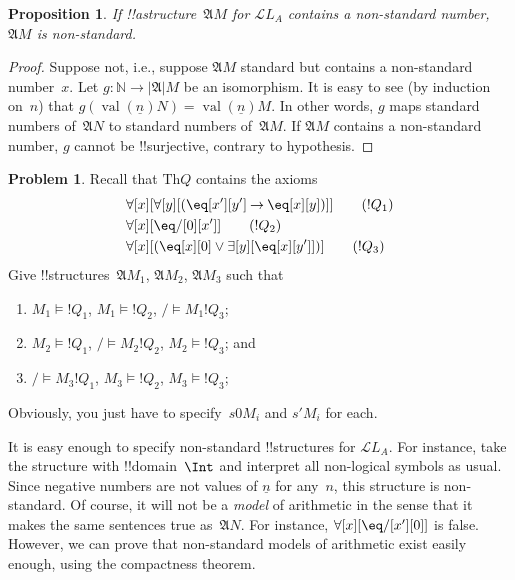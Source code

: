 \documentclass[10pt,a4paper]{article}
\theoremstyle{plain}
\newtheorem{prop}[thm]{Proposition}
\theoremstyle{definition}
\newtheorem{prob}{Problem}[section]
\theoremstyle{remark}
\newenvironment{explain}{}{}
\providecommand{\lif}{\mathbin{\rightarrow}}
\providecommand{\lforall}{\mathord{\forall}}
\providecommand{\lexists}{\mathord{\exists}}
\providecommand{\Obj}{}
\providecommand{\Struct}{\ensuremath{\mathfrak{A}}}
\providecommand{\Domain}{\ensuremath{|\mathfrak{A}|}}
\providecommand{\Assign}{\ensuremath{s}}
\providecommand{\Sat}[2]{\ensuremath{#1 \models #2}}
\providecommand{\Lang}{\ensuremath{\mathcal{L}}}
\providecommand{\Th}{\ensuremath{\mathrm{Th}}}
\providecommand{\num}[1]{\underline{#1}}
\providecommand{\Nat}{\ensuremath{\mathbb{N}}}
\providecommand{\Value}[1]{\operatorname{val}(#1)}
\begin{document}
\begin{prop}
If !!a{structure}~$\Struct{M}$ for $\Lang{L_A}$ contains a
non-standard number, $\Struct{M}$ is non-standard.
\end{prop}

\begin{proof}
Suppose not, i.e., suppose $\Struct{M}$ standard but contains a
non-standard number~$x$. Let $g\colon \Nat \to \Domain{M}$ be an
isomorphism. It is easy to see (by induction on~$n$) that
$g(\Value{\num{n}}{N}) = \Value{\num{n}}{M}$. In other words, $g$ maps
standard numbers of~$\Struct{N}$ to standard numbers
of~$\Struct{M}$. If $\Struct{M}$ contains a non-standard number, $g$
cannot be !!{surjective}, contrary to hypothesis.
\end{proof}

\begin{prob}
Recall that $\Th{Q}$ contains the axioms
\begin{align*}
& \lforall[x][\lforall[y][(\eq[x'][y'] \lif \eq[x][y])]] \tag{$!Q_1$}\\
& \lforall[x][\eq/[\Obj 0][x']] \tag{$!Q_2$}\\
& \lforall[x][(\eq[x][\Obj 0] \lor \lexists[y][\eq[x][y']])] \tag{$!Q_3$}
\end{align*}
Give !!{structure}s~$\Struct{M_1}$, $\Struct{M_2}$, $\Struct{M_3}$ such that
\begin{enumerate}
\item $\Sat{M_1}{!Q_1}$, $\Sat{M_1}{!Q_2}$, $\Sat/{M_1}{!Q_3}$;
\item $\Sat{M_2}{!Q_1}$, $\Sat/{M_2}{!Q_2}$, $\Sat{M_2}{!Q_3}$; and
\item $\Sat/{M_3}{!Q_1}$, $\Sat{M_3}{!Q_2}$, $\Sat{M_3}{!Q_3}$;
\end{enumerate}
Obviously, you just have to specify~$\Assign{\Obj{0}}{M_i}$ and
$\Assign{\prime}{M_i}$ for each.
\end{prob}

\begin{explain}
It is easy enough to specify non-standard !!{structure}s for
$\Lang{L_A}$. For instance, take the structure with !!{domain}~$\Int$
and interpret all non-logical symbols as usual. Since negative numbers
are not values of $\num{n}$ for any~$n$, this structure is
non-standard. Of course, it will not be a \emph{model} of arithmetic
in the sense that it makes the same sentences true
as~$\Struct{N}$. For instance, $\lforall[x][\eq/[x'][\Obj{0}]]$ is
false.  However, we can prove that non-standard models of arithmetic
exist easily enough, using the compactness theorem.
\end{explain}
\end{document}
